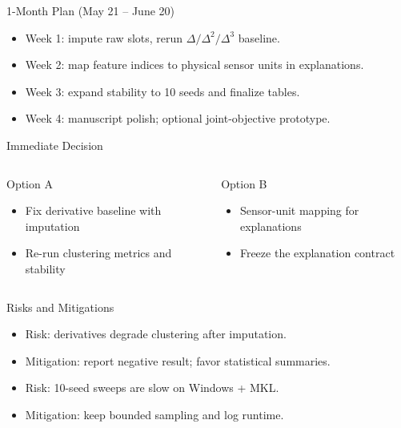 \documentclass[aspectratio=169]{beamer}
\begin{document}
\begin{frame}{1-Month Plan (May 21 -- June 20)}
\begin{itemize}\footnotesize\setlength\itemsep{4pt}
	\item Week 1: impute raw slots, rerun $\Delta/\Delta^2/\Delta^3$ baseline.
	\item Week 2: map feature indices to physical sensor units in explanations.
	\item Week 3: expand stability to 10 seeds and finalize tables.
	\item Week 4: manuscript polish; optional joint-objective prototype.
\end{itemize}
\end{frame}

\begin{frame}{Immediate Decision}
\begin{columns}[T,onlytextwidth]
	\begin{block}{Option A}
		\begin{itemize}\footnotesize\setlength\itemsep{3pt}
			\item Fix derivative baseline with imputation
			\item Re-run clustering metrics and stability
		\end{itemize}
	\end{block}
	\begin{block}{Option B}
		\begin{itemize}\footnotesize\setlength\itemsep{3pt}
			\item Sensor-unit mapping for explanations
			\item Freeze the explanation contract
		\end{itemize}
	\end{block}
\end{columns}
\end{frame}

\begin{frame}{Risks and Mitigations}
\begin{itemize}\footnotesize\setlength\itemsep{4pt}
	\item Risk: derivatives degrade clustering after imputation.
	\item Mitigation: report negative result; favor statistical summaries.
	\item Risk: 10-seed sweeps are slow on Windows + MKL.
	\item Mitigation: keep bounded sampling and log runtime.
\end{itemize}
\end{frame}
\end{document}
